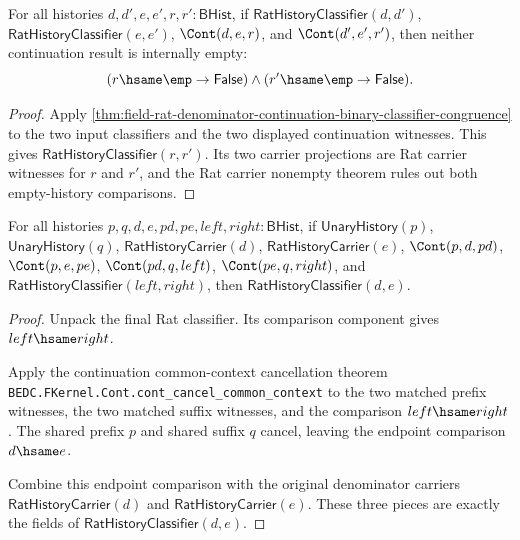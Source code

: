 \begin{theorem}
\label{thm:field-rat-history-classifier-continuation-result-not-empty}
For all histories $d,d',e,e',r,r':\mathsf{BHist}$, if
$\mathsf{RatHistoryClassifier}(d,d')$,
$\mathsf{RatHistoryClassifier}(e,e')$, $\Cont(d,e,r)$, and
$\Cont(d',e',r')$, then neither continuation result is internally empty:
$$
(r\hsame\emp\to\mathsf{False})\land
(r'\hsame\emp\to\mathsf{False}).
$$
\end{theorem}
\begin{proof}
Apply
\autoref{thm:field-rat-denominator-continuation-binary-classifier-congruence}
to the two input classifiers and the two displayed continuation witnesses.
This gives $\mathsf{RatHistoryClassifier}(r,r')$. Its two carrier projections
are Rat carrier witnesses for $r$ and $r'$, and the Rat carrier nonempty
theorem rules out both empty-history comparisons.
\end{proof}

\begin{theorem}
\label{thm:field-rat-denominator-continuation-common-context-cancellation}
For all histories $p,q,d,e,pd,pe,left,right:\mathsf{BHist}$, if
$\mathsf{UnaryHistory}(p)$, $\mathsf{UnaryHistory}(q)$,
$\mathsf{RatHistoryCarrier}(d)$, $\mathsf{RatHistoryCarrier}(e)$,
$\Cont(p,d,pd)$, $\Cont(p,e,pe)$, $\Cont(pd,q,left)$,
$\Cont(pe,q,right)$, and $\mathsf{RatHistoryClassifier}(left,right)$, then
$\mathsf{RatHistoryClassifier}(d,e)$.
\end{theorem}
\begin{proof}
Unpack the final Rat classifier. Its comparison component gives
$left\hsame right$.

Apply the continuation common-context cancellation theorem
\texttt{BEDC.FKernel.Cont.cont\_cancel\_common\_context} to the two matched
prefix witnesses, the two matched suffix witnesses, and the comparison
$left\hsame right$. The shared prefix $p$ and shared suffix $q$ cancel, leaving
the endpoint comparison $d\hsame e$.

Combine this endpoint comparison with the original denominator carriers
$\mathsf{RatHistoryCarrier}(d)$ and $\mathsf{RatHistoryCarrier}(e)$. These
three pieces are exactly the fields of
$\mathsf{RatHistoryClassifier}(d,e)$.
\end{proof}


